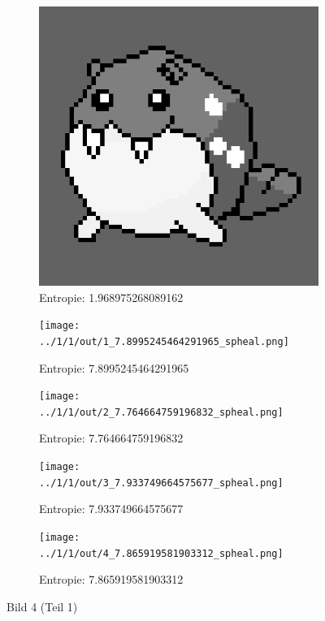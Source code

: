 \begin{figure}
	\centering

	\begin{subfigure}{0.25\textwidth}
		\includegraphics[width=\textwidth]{../1/3/gray_1.968975268089162_spheal.png}
		\caption{Entropie: 1.968975268089162}
	\end{subfigure}

	\begin{subfigure}{0.25\textwidth}
		\texttt{[image: ../1/1/out/1\_7.8995245464291965\_spheal.png]}
		\caption{Entropie: 7.8995245464291965}
	\end{subfigure}

	\begin{subfigure}{0.25\textwidth}
		\texttt{[image: ../1/1/out/2\_7.764664759196832\_spheal.png]}
		\caption{Entropie: 7.764664759196832}
	\end{subfigure}

	\begin{subfigure}{0.25\textwidth}
		\texttt{[image: ../1/1/out/3\_7.933749664575677\_spheal.png]}
		\caption{Entropie: 7.933749664575677}
	\end{subfigure}

	\begin{subfigure}{0.25\textwidth}
		\texttt{[image: ../1/1/out/4\_7.865919581903312\_spheal.png]}
		\caption{Entropie: 7.865919581903312}
	\end{subfigure}
	\caption{Bild 4 (Teil 1)}
\end{figure}
